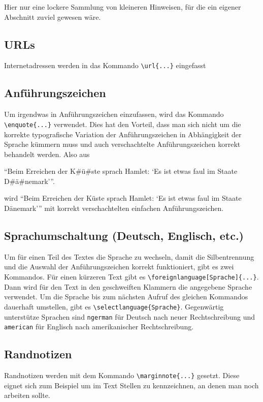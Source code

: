 Hier nur eine lockere Sammlung von kleineren Hinweisen, für die ein eigener
Abschnitt zuviel gewesen wäre.

\subsection{URLs}

Internetadressen werden in das Kommando \verb#\url{...}# eingefasst

\subsection{Anführungszeichen}

Um irgendwas in Anführungszeichen einzufassen, wird das Kommando 
\verb#\enquote{...}# verwendet. Dies hat den Vorteil, dass man sich nicht um die
korrekte typografische Variation der Anführungszeichen in Abhängigkeit der
Sprache kümmern muss und auch verschachtelte Anführungszeichen korrekt behandelt
werden. Also aus
\begin{latex}[caption={Behandlung von Anführungszeichen},label={lst:quotes},escapechar=\#]
 \enquote{Beim Erreichen der K#ü#ste sprach Hamlet: \enquote{Es ist etwas faul im Staate D#ä#nemark}}.
\end{latex}
wird \enquote{Beim Erreichen der Küste sprach Hamlet: \enquote{Es ist etwas faul
im Staate Dänemark}} mit korrekt verschachtelten einfachen Anführungszeichen.

\subsection{Sprachumschaltung (Deutsch, Englisch, etc.)}

Um für einen Teil des Textes die Sprache zu wechseln, damit die
Silbentrennung und die Auswahl der Anführungszeichen
korrekt funktioniert, gibt es zwei Kommandos. Für einen kürzeren Text gibt es
\verb#\foreignlanguage[Sprache]{...}#. Dann wird für den Text in den
geschweiften Klammern die angegebene Sprache verwendet. Um die Sprache bis zum
nächsten Aufruf des gleichen Kommandos dauerhaft umstellen, gibt es
\verb#\selectlanguage{Sprache}#. Gegenwärtig unterstütze Sprachen sind
\texttt{ngerman} für Deutsch nach neuer
Rechtschreibung und \texttt{american} für
Englisch nach amerikanischer Rechtschreibung.

\subsection{Randnotizen}

Randnotizen werden mit dem Kommando \verb#\marginnote{...}# gesetzt.
Diese eignet sich zum Beispiel um im Text Stellen zu kennzeichnen, an denen
man noch arbeiten sollte.

